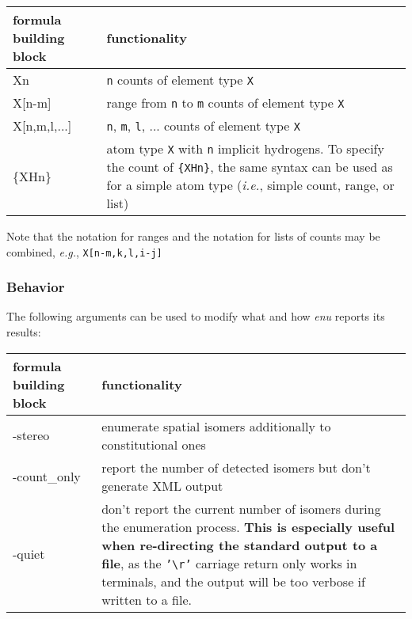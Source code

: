 \documentclass[a4paper,11pt]{article}
\begin{document}
\begin{table}[H]
\begin{tabular}{>{\ttfamily\raggedright}p{}|p{}}
    \hline
    \textnormal{formula building block} & functionality \\
    \hline\hline
    Xn           & \texttt{n} counts of element type \texttt{X} \\
    X[n-m]       & range from \texttt{n} to \texttt{m} counts of element type \texttt{X}\\
    X[n,m,l,...] & \texttt{n}, \texttt{m}, \texttt{l}, ... counts of element type \texttt{X} \\
    \{XHn\}      & atom type \texttt{X} with \texttt{n} implicit hydrogens. To specify the count of \texttt{\{XHn\}}, the same syntax can be used as for a simple atom type (\textit{i.e.}, simple count, range, or list) \\
    \hline
\end{tabular}
\end{table}

Note that the notation for ranges and the notation for lists of counts may be combined, \textit{e.g.}, \texttt{X[n-m,k,l,i-j]}

\subsubsection{Behavior}

The following arguments can be used to modify what and how \textit{enu} reports its results:

\begin{table}[H]
\begin{tabular}{>{\ttfamily\raggedright}p{}|p{}}
    \hline
    \textnormal{formula building block} & functionality \\
    \hline\hline
    -stereo & enumerate spatial isomers additionally to constitutional ones\\
    \hline
    -count\_only & report the number of detected isomers but don't generate XML output\\
    \hline
    -quiet & don't report the current number of isomers during the enumeration process. \textbf{This is especially useful when re-directing the standard output to a file}, as the \texttt{'\textbackslash r'} carriage return only works in terminals, and the output will be too verbose if written to a file.\\
    \hline
\end{tabular}
\end{table}
\end{document}
